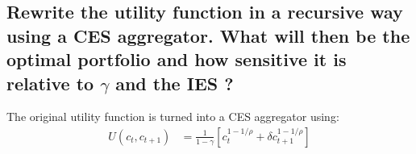 \documentclass[]{article}
\begin{document}
\subsection{Rewrite the utility function in a recursive way using a CES aggregator. What will then be the optimal portfolio and how sensitive it is relative to $\gamma$ and the IES ?}
The original utility function is turned into a CES aggregator using:
\begin{align*}
	U(c_t, c_{t+1}) &= \frac{1}{1-\gamma} \left[c_t^{1-1/\rho} + \delta c_{t+1}^{1-1/\rho}\right]
\end{align*}
\end{document}
